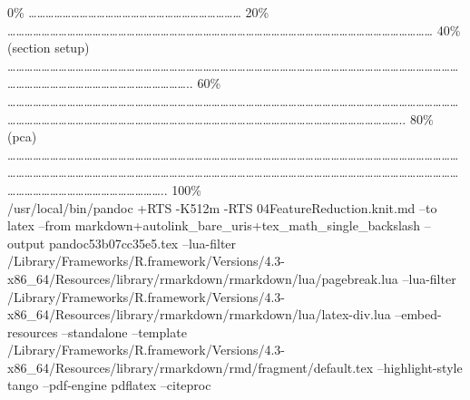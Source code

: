\documentclass[
]{article}
\begin{document}
\textbar{} \textbar{} \textbar{} 0\% \textbar{}
\textbar\ldots\ldots\ldots\ldots\ldots\ldots\ldots\ldots\ldots\ldots\ldots\ldots\ldots\ldots\ldots\ldots\ldots\ldots\ldots\ldots\ldots\ldots\ldots\ldots\ldots{}
\textbar{} 20\% \textbar{}
\textbar\ldots\ldots\ldots\ldots\ldots\ldots\ldots\ldots\ldots\ldots\ldots\ldots\ldots\ldots\ldots\ldots\ldots\ldots\ldots\ldots\ldots\ldots\ldots\ldots\ldots\ldots\ldots\ldots\ldots\ldots\ldots\ldots\ldots\ldots\ldots\ldots\ldots\ldots\ldots\ldots\ldots\ldots\ldots\ldots\ldots\ldots\ldots\ldots\ldots\ldots{}
\textbar{} 40\% (section setup) \textbar{}
\textbar\ldots\ldots\ldots\ldots\ldots\ldots\ldots\ldots\ldots\ldots\ldots\ldots\ldots\ldots\ldots\ldots\ldots\ldots\ldots\ldots\ldots\ldots\ldots\ldots\ldots\ldots\ldots\ldots\ldots\ldots\ldots\ldots\ldots\ldots\ldots\ldots\ldots\ldots\ldots\ldots\ldots\ldots\ldots\ldots\ldots\ldots\ldots\ldots\ldots\ldots\ldots\ldots\ldots\ldots\ldots\ldots\ldots\ldots\ldots\ldots\ldots\ldots\ldots\ldots\ldots\ldots\ldots\ldots\ldots\ldots\ldots\ldots\ldots\ldots..
\textbar{} 60\% \textbar{}
\textbar\ldots\ldots\ldots\ldots\ldots\ldots\ldots\ldots\ldots\ldots\ldots\ldots\ldots\ldots\ldots\ldots\ldots\ldots\ldots\ldots\ldots\ldots\ldots\ldots\ldots\ldots\ldots\ldots\ldots\ldots\ldots\ldots\ldots\ldots\ldots\ldots\ldots\ldots\ldots\ldots\ldots\ldots\ldots\ldots\ldots\ldots\ldots\ldots\ldots\ldots\ldots\ldots\ldots\ldots\ldots\ldots\ldots\ldots\ldots\ldots\ldots\ldots\ldots\ldots\ldots\ldots\ldots\ldots\ldots\ldots\ldots\ldots\ldots\ldots\ldots\ldots\ldots\ldots\ldots\ldots\ldots\ldots\ldots\ldots\ldots\ldots\ldots\ldots\ldots\ldots\ldots\ldots\ldots\ldots\ldots\ldots\ldots\ldots\ldots..
\textbar{} 80\% (pca) \textbar{}
\textbar\ldots\ldots\ldots\ldots\ldots\ldots\ldots\ldots\ldots\ldots\ldots\ldots\ldots\ldots\ldots\ldots\ldots\ldots\ldots\ldots\ldots\ldots\ldots\ldots\ldots\ldots\ldots\ldots\ldots\ldots\ldots\ldots\ldots\ldots\ldots\ldots\ldots\ldots\ldots\ldots\ldots\ldots\ldots\ldots\ldots\ldots\ldots\ldots\ldots\ldots\ldots\ldots\ldots\ldots\ldots\ldots\ldots\ldots\ldots\ldots\ldots\ldots\ldots\ldots\ldots\ldots\ldots\ldots\ldots\ldots\ldots\ldots\ldots\ldots\ldots\ldots\ldots\ldots\ldots\ldots\ldots\ldots\ldots\ldots\ldots\ldots\ldots\ldots\ldots\ldots\ldots\ldots\ldots\ldots\ldots\ldots\ldots\ldots\ldots\ldots\ldots\ldots\ldots\ldots\ldots\ldots\ldots\ldots\ldots\ldots\ldots\ldots\ldots\ldots\ldots\ldots\ldots\ldots\ldots\ldots\ldots\ldots\ldots\ldots..\textbar{}
100\%\\
/usr/local/bin/pandoc +RTS -K512m -RTS 04FeatureReduction.knit.md --to
latex --from markdown+autolink\_bare\_uris+tex\_math\_single\_backslash
--output pandoc53b07cc35e5.tex --lua-filter
/Library/Frameworks/R.framework/Versions/4.3-x86\_64/Resources/library/rmarkdown/rmarkdown/lua/pagebreak.lua
--lua-filter
/Library/Frameworks/R.framework/Versions/4.3-x86\_64/Resources/library/rmarkdown/rmarkdown/lua/latex-div.lua
--embed-resources --standalone --template
/Library/Frameworks/R.framework/Versions/4.3-x86\_64/Resources/library/rmarkdown/rmd/fragment/default.tex
--highlight-style tango --pdf-engine pdflatex --citeproc
\end{document}
